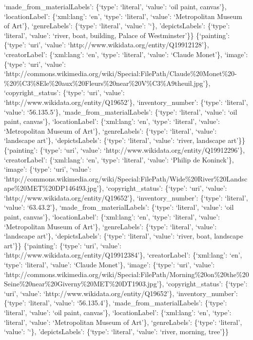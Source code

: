 \documentclass[
  letterpaper,
  DIV=11,
  numbers=noendperiod]{scrreprt}
\begin{document}
`made\_from\_materialLabels': \{`type': `literal', `value': `oil paint,
canvas'\}, `locationLabel': \{`xml:lang': `en', `type': `literal',
`value': `Metropolitan Museum of Art'\}, `genreLabels': \{`type':
`literal', `value': '`\}, 'depictsLabels': \{`type': `literal', `value':
`river, boat, building, Palace of Westminster'\}\} \{`painting':
\{`type': `uri', `value': `http://www.wikidata.org/entity/Q19912128'\},
`creatorLabel': \{`xml:lang': `en', `type': `literal', `value': `Claude
Monet'\}, `image': \{`type': `uri', `value':
`http://commons.wikimedia.org/wiki/Special:FilePath/Claude\%20Monet\%20-\%20\%C3\%8Ele\%20aux\%20Fleurs\%20near\%20V\%C3\%A9theuil.jpg'\},
`copyright\_status': \{`type': `uri', `value':
`http://www.wikidata.org/entity/Q19652'\}, `inventory\_number':
\{`type': `literal', `value': `56.135.5'\},
`made\_from\_materialLabels': \{`type': `literal', `value': `oil paint,
canvas'\}, `locationLabel': \{`xml:lang': `en', `type': `literal',
`value': `Metropolitan Museum of Art'\}, `genreLabels': \{`type':
`literal', `value': `landscape art'\}, `depictsLabels': \{`type':
`literal', `value': `river, landscape art'\}\} \{`painting': \{`type':
`uri', `value': `http://www.wikidata.org/entity/Q19912296'\},
`creatorLabel': \{`xml:lang': `en', `type': `literal', `value': `Philip
de Koninck'\}, `image': \{`type': `uri', `value':
`http://commons.wikimedia.org/wiki/Special:FilePath/Wide\%20River\%20Landscape\%20MET\%20DP146493.jpg'\},
`copyright\_status': \{`type': `uri', `value':
`http://www.wikidata.org/entity/Q19652'\}, `inventory\_number':
\{`type': `literal', `value': `63.43.2'\}, `made\_from\_materialLabels':
\{`type': `literal', `value': `oil paint, canvas'\}, `locationLabel':
\{`xml:lang': `en', `type': `literal', `value': `Metropolitan Museum of
Art'\}, `genreLabels': \{`type': `literal', `value': `landscape art'\},
`depictsLabels': \{`type': `literal', `value': `river, boat, landscape
art'\}\} \{`painting': \{`type': `uri', `value':
`http://www.wikidata.org/entity/Q19912384'\}, `creatorLabel':
\{`xml:lang': `en', `type': `literal', `value': `Claude Monet'\},
`image': \{`type': `uri', `value':
`http://commons.wikimedia.org/wiki/Special:FilePath/Morning\%20on\%20the\%20Seine\%20near\%20Giverny\%20MET\%20DT1903.jpg'\},
`copyright\_status': \{`type': `uri', `value':
`http://www.wikidata.org/entity/Q19652'\}, `inventory\_number':
\{`type': `literal', `value': `56.135.4'\},
`made\_from\_materialLabels': \{`type': `literal', `value': `oil paint,
canvas'\}, `locationLabel': \{`xml:lang': `en', `type': `literal',
`value': `Metropolitan Museum of Art'\}, `genreLabels': \{`type':
`literal', `value': '`\}, 'depictsLabels': \{`type': `literal', `value':
`river, morning, tree'\}\}
\end{document}
